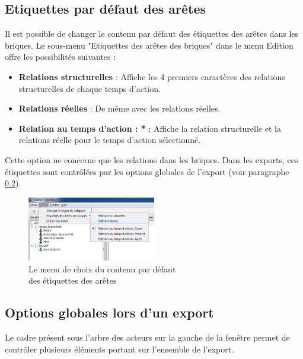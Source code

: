 \subsection{Etiquettes par défaut des arêtes}
Il est possible de changer le contenu par défaut des étiquettes des arêtes dans les briques. Le sous-menu "Etiquettes des arêtes des briques" dans le menu Edition offre les possibilités suivantes :\\
\begin{itemize}
\item \textbf{Relations structurelles} : Affiche les 4 premiers caractères des relations structurelles de chaque temps d'action.\\
\item \textbf{Relations réelles} : De même avec les relations réelles.\\
\item \textbf{Relation au temps d'action : *} : Affiche la relation structurelle et la relations réelle pour le temps d'action sélectionné.\\ 
\end{itemize}

Cette option ne concerne que les relations dans les briques. Dans les exports, ces étiquettes sont contrôlées par les options globales de l'export (voir paragraphe \ref{globalExport}).\\

\begin{figure}[h!]
\centering
\includegraphics[width=0.5\textwidth]{../images/menu_edition.png}
\caption{Le menu de choix du contenu par défaut\\des étiquettes des arêtes}
\label{menu_edition}
\end{figure}

\subsection{Options globales lors d'un export}
\label{globalExport}
Le cadre présent sous l'arbre des acteurs sur la gauche de la fenêtre permet de contrôler plusieurs éléments portant sur l'ensemble de l'export.\\

